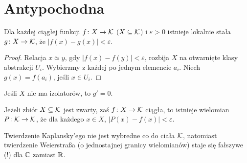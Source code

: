 \section{Antypochodna}
\begin{fakt}
	Dla każdej ciągłej funkcji $f \colon X \to \mathcal K$ ($X \subseteq \mathcal K$) i $\varepsilon > 0$ istnieje lokalnie stała $g \colon X \to \mathcal K$, że $|f(x) - g(x)| < \varepsilon$.
\end{fakt}

\begin{proof}
	Relacja $x \simeq y$, gdy $|f(x) - f(y)| < \varepsilon$, rozbija $X$ na otwarnięte klasy abstrakcji $U_i$.
	Wybierzmy z każdej po jednym elemencie $a_i$.
	Niech $g(x) = f(a_i)$, jeśli $x \in U_i$.
\end{proof}

\begin{wniosek}
	Jeśli $X$ nie ma izolatorów, to $g' = 0$.
\end{wniosek}

\begin{twierdzenie}[Kaplansky]
	Jeżeli zbiór $X \subseteq \mathcal K$ jest zwarty, zaś $f \colon X \to \mathcal K$ ciągła, to istnieje wielomian $P \colon \mathcal K \to \mathcal K$, że dla każdego $x \in X$, $|P(x) - f(x)| < \varepsilon$.
\end{twierdzenie}

Twierdzenie Kaplansky'ego nie jest wybredne co do ciała $\mathcal K$, natomiast twierdzenie Weierstraßa (o jednostajnej granicy wielomianów) staje się fałszywe (!) dla $\mathbb C$ zamiast $\mathbb R$.

